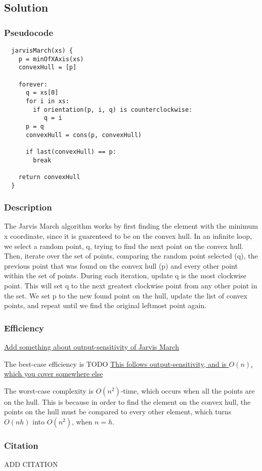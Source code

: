 \subsection*{Solution}
\subsubsection*{Pseudocode}
\begin{verbatim}
  jarvisMarch(xs) {
    p = minOfXAxis(xs)
    convexHull = [p]

    forever:
      q = xs[0]
      for i in xs:
        if orientation(p, i, q) is counterclockwise:
           q = i
      p = q
      convexHull = cons(p, convexHull)

      if last(convexHull) == p:
        break

    return convexHull
  }
\end{verbatim}

\subsubsection*{Description}
The Jarvis March algorithm works by first finding the element with the minimum x coordinate, since it is guarenteed to be on the convex hull. In an infinite loop, we select a random point, q, trying to find the next point on the convex hull. Then, iterate over the set of points, comparing the random point selected (q), the previous point that was found on the convex hull (p) and every other point within the set of points. During each iteration, update q is the most clockwise point. This will set q to the next greatest clockwise point from any other point in the set. We set p to the new found point on the hull, update the list of convex points, and repeat until we find the original leftmost point again.

\subsubsection*{Efficiency}

\underline{Add something about output-sensitivity of Jarvis March}

The best-case efficiency is TODO \underline{This follows output-sensitivity, and is $O(n)$, which you cover somewhere else}

The worst-case complexity is $O(n^2)$-time, which occurs when all the points are on the hull. This is because in order to find the element on the convex hull, the points on the hull must be compared to every other element, which turns $O(nh)$ into $O(n^{2})$, when $n = h$.

\subsubsection*{Citation}

ADD CITATION
